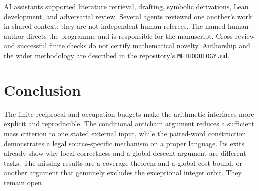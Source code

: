 \documentclass[11pt,a4paper]{article}
\theoremstyle{definition}
\begin{document}
AI assistants supported literature retrieval, drafting, symbolic
derivations, Lean development, and adversarial review. Several agents
reviewed one another's work in shared context; they are not independent
human referees. The named human author directs the programme and is
responsible for the manuscript. Cross-review and successful finite
checks do not certify mathematical novelty. Authorship and the wider
methodology are described in the repository's \texttt{METHODOLOGY.md}.

\section{Conclusion}
The finite reciprocal and occupation budgets make the arithmetic
interfaces more explicit and reproducible. The conditional antichain
argument reduces a sufficient mass criterion to one stated external
input, while the paired-word construction demonstrates a legal
source-specific mechanism on a proper language. Its exits already
show why local correctness and a global descent argument are different
tasks. The missing results are a coverage theorem and a global cost
bound, or another argument that genuinely excludes the exceptional
integer orbit. They remain open.


\end{document}
